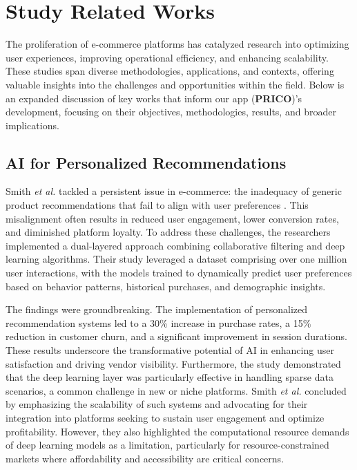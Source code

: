 \documentclass[12pt]{report}
\begin{document}
\section{Study Related Works}

The proliferation of e-commerce platforms has catalyzed research into optimizing user
experiences, improving operational efficiency, and enhancing scalability. These studies span
diverse methodologies, applications, and contexts, offering valuable insights into the
challenges and opportunities within the field. Below is an expanded discussion of key works
that inform our app (\textbf{PRICO})’s development, focusing on their objectives, methodologies,
results, and broader implications.

\subsection*{AI for Personalized Recommendations}

Smith \textit{et al.} tackled a persistent issue in e-commerce: the inadequacy of generic product
recommendations that fail to align with user preferences \cite{c16}. This misalignment often results
in reduced user engagement, lower conversion rates, and diminished platform loyalty. To
address these challenges, the researchers implemented a dual-layered approach combining
collaborative filtering and deep learning algorithms. Their study leveraged a dataset
comprising over one million user interactions, with the models trained to dynamically predict
user preferences based on behavior patterns, historical purchases, and demographic insights.

The findings were groundbreaking. The implementation of personalized recommendation
systems led to a 30\% increase in purchase rates, a 15\% reduction in customer churn, and a
significant improvement in session durations. These results underscore the transformative
potential of AI in enhancing user satisfaction and driving vendor visibility. Furthermore, the
study demonstrated that the deep learning layer was particularly effective in handling sparse
data scenarios, a common challenge in new or niche platforms. Smith \textit{et al.} concluded by
emphasizing the scalability of such systems and advocating for their integration into
platforms seeking to sustain user engagement and optimize profitability. However, they also
highlighted the computational resource demands of deep learning models as a limitation,
particularly for resource-constrained markets where affordability and accessibility are critical
concerns\cite{c16}.
\end{document}
